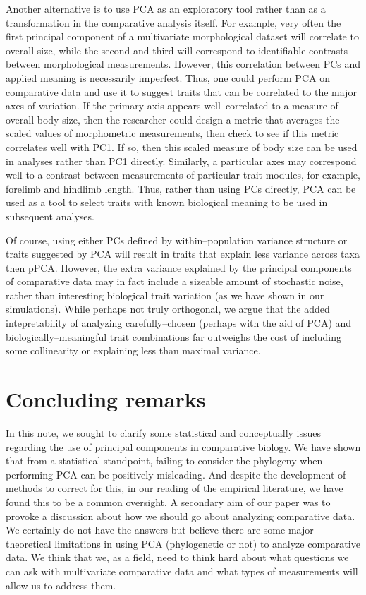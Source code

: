 \documentclass[a4paper,12pt]{article}
\begin{document}
Another alternative is to use PCA as an exploratory tool rather than as a transformation in the comparative analysis itself. For example, very often the first principal component of a multivariate morphological dataset will correlate to overall size, while the second and third will correspond to identifiable contrasts between morphological measurements. However, this correlation between PCs and applied meaning is necessarily imperfect. Thus, one could perform PCA on comparative data and use it to suggest traits that can be correlated to the major axes of variation. If the primary axis appears well--correlated to a measure of overall body size, then the researcher could design a metric that averages the scaled values of morphometric measurements, then check to see if this metric correlates well with PC1. If so, then this scaled measure of body size can be used in analyses rather than PC1 directly. Similarly, a particular axes may correspond well to a contrast between measurements of particular trait modules, for example, forelimb and hindlimb length. Thus, rather than using PCs directly, PCA can be used as a tool to select traits with known biological meaning to be used in subsequent analyses.

Of course, using either PCs defined by within--population variance structure or traits suggested by PCA will result in traits that explain less variance across taxa then pPCA. However, the extra variance explained by the principal components of comparative data may in fact include a sizeable amount of stochastic noise, rather than interesting biological trait variation (as we have shown in our simulations). While perhaps not truly orthogonal, we argue that the added intepretability of analyzing carefully--chosen (perhaps with the aid of PCA) and biologically--meaningful trait combinations far outweighs the cost of including some collinearity or explaining less than maximal variance.

\section{Concluding remarks}
In this note, we sought to clarify some statistical and conceptually issues regarding the use of principal components in comparative biology. We have shown that from a statistical standpoint, failing to consider the phylogeny when performing PCA can be positively misleading. And despite the development of methods to correct for this, in our reading of the empirical literature, we have found this to be a common oversight. A secondary aim of our paper was to provoke a discussion about how we should go about analyzing comparative data. We certainly do not have the answers but believe there are some major theoretical limitations in using PCA (phylogenetic or not) to analyze comparative data. We think that we, as a field, need to think hard about what questions we can ask with multivariate comparative data and what types of measurements will allow us to address them.

\newpage



\end{document}
